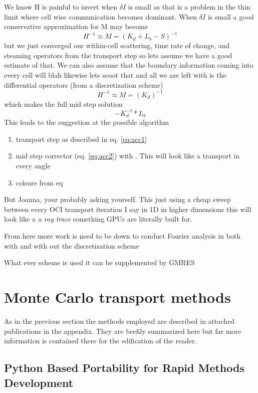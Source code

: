 We know H is painful to invert when $\delta I$ is small as that is a problem in the thin limit where cell wise communication becomes dominant.
When $\delta I$ is small a good conservative approximation for M may become
\begin{equation}
    H^{-1} \approx M = (K_d + L_b - S)^{-1}
\end{equation}
but we just converged our within-cell scattering, time rate of change, and steaming operators from the transport step so lets assume we have a good estimate of that.
We can also assume that the boundary information coming into every cell will blah likewise lets scoot that and all we are left with is the differential operators (from a discretization scheme)
\begin{equation}
    H^{-1} \approx M = (K_d)^{-1}
\end{equation}
which makes the full mid step solution
\begin{equation}
    \label{eq:m}
    -K_d^{-1}*L_b
\end{equation}
This leads to the suggestion at the possible algorithm
\begin{enumerate}
    \item transport step as described in eq. \ref{eq:acc1}
    \item mid step corrector (eq. \ref{eq:acc2}) with . This will look like a transport in every angle
    \item colsure from eq
\end{enumerate}
But Joanna, your probably asking yourself. 
This just using a cheap sweep between every OCI transport iteration
I say in 1D
in higher dimensions this will look like a \textit{a ray trace} something GPUs are literally built for.

From here more work is need to be down to conduct Fourier analysis in both with and with out the discretization scheme

What ever scheme is used it can be supplemented by GMRES

\section{Monte Carlo transport methods}
As in the previous section the methods employed are described in attached publications in the appendix.
They are beefily summarized here but far more information is contained there for the edification of the reader.

%   
\subsection{Python Based Portability for Rapid Methods Development}

